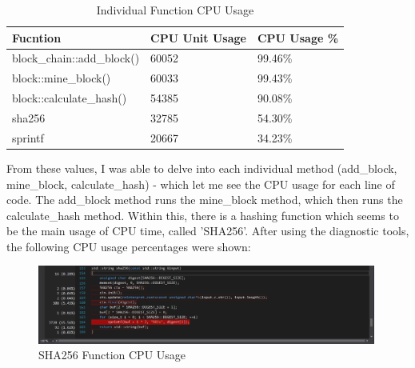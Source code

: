 \documentclass[12pt, a4paper]{article}
\begin{document}
\begin{table}
    \centering
    \begin{tabular}{| l | l | l |}
    \hline
    Fucntion & CPU Unit Usage & CPU Usage \%  \\ \hline
    block\_chain::add\_block() & 60052 & 99.46\% \\ \hline
    block::mine\_block() & 60033 & 99.43\% \\ \hline
    block::calculate\_hash() & 54385 & 90.08\% \\ \hline
    sha256 & 32785 & 54.30\% \\ \hline
    sprintf & 20667 & 34.23\% \\ \hline
    \end{tabular}
    \caption{Individual Function CPU Usage}
\end{table}
\medskip
From these values, I was able to delve into each individual method (add\_block, mine\_block, calculate\_hash) - which let me see the CPU usage for each line of code. The add\_block method runs the mine\_block method, which then runs the calculate\_hash method. Within this, there is a hashing function which seems to be the main usage of CPU time, called 'SHA256'. After using the diagnostic tools, the following CPU usage percentages were shown:

\begin{figure}[H]
	\centering
		\includegraphics[width=0.99\textwidth]{"SHA256"}
		\caption{SHA256 Function CPU Usage}
\end{figure}
\end{document}
